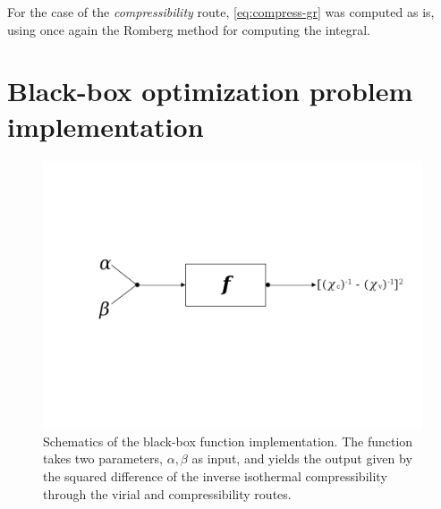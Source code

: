 For the case of the \emph{compressibility} route, \autoref{eq:compress-gr} was computed as 
is, using once again the Romberg method for computing the integral.

\section{Black-box optimization problem implementation}
\begin{figure}
    \centering
    \vspace{-2cm}
    \includegraphics[scale=0.3]{figuras/capitulo-5/black-box-function.png}
    \vspace{-3cm}
    \caption{Schematics of the black-box function implementation. The function takes two parameters, \(\alpha, \beta\) as input, and yields the output given by the squared difference of the inverse isothermal compressibility through the virial and compressibility routes.}
    \label{fig:black-box-function}
\end{figure}

